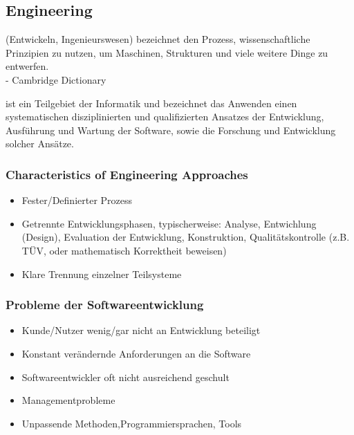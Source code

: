 \documentclass[ngerman]{tuda_summary}
\begin{document}
\subsection{Engineering}
\begin{definition}[Engineering]
    (Entwickeln, Ingenieurswesen) bezeichnet den Prozess, wissenschaftliche Prinzipien zu nutzen, um Maschinen, Strukturen und viele weitere Dinge zu entwerfen.\\
    \phantom{a}\hfill - Cambridge Dictionary
\end{definition}
\begin{definition}
    ist ein Teilgebiet der Informatik und bezeichnet das Anwenden einen systematischen disziplinierten und qualifizierten Ansatzes der Entwicklung, Ausführung und Wartung der Software, sowie die Forschung und Entwicklung solcher Ansätze.
\end{definition}
\subsubsection{Characteristics of Engineering Approaches}
\begin{itemize}
    \item Fester/Definierter Prozess
    \item Getrennte Entwicklungsphasen, typischerweise: Analyse, Entwichlung (Design), Evaluation der Entwicklung, Konstruktion, Qualitätskontrolle (z.B. TÜV, oder mathematisch Korrektheit beweisen)
    \item Klare Trennung einzelner Teilsysteme
\end{itemize}
\subsubsection{Probleme der Softwareentwicklung}
\begin{itemize}
    \item Kunde/Nutzer wenig/gar nicht an Entwicklung beteiligt
    \item Konstant verändernde Anforderungen an die Software
    \item Softwareentwickler oft nicht ausreichend geschult
    \item Managementprobleme
    \item Unpassende Methoden,Programmiersprachen, Tools
\end{itemize}
\clearpage
\end{document}
